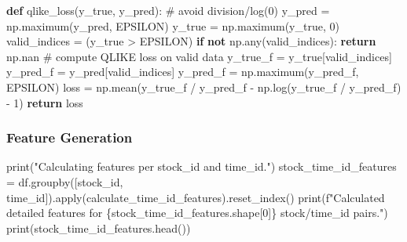 \documentclass[
  letterpaper,
  DIV=11,
  numbers=noendperiod]{scrartcl}
\newenvironment{Shaded}{\begin{snugshade}}{\end{snugshade}}
\newcommand{\BuiltInTok}[1]{\textcolor[rgb]{0.00,0.23,0.31}{#1}}
\newcommand{\CommentTok}[1]{\textcolor[rgb]{0.37,0.37,0.37}{#1}}
\newcommand{\ControlFlowTok}[1]{\textcolor[rgb]{0.00,0.23,0.31}{\textbf{#1}}}
\newcommand{\DecValTok}[1]{\textcolor[rgb]{0.68,0.00,0.00}{#1}}
\newcommand{\KeywordTok}[1]{\textcolor[rgb]{0.00,0.23,0.31}{\textbf{#1}}}
\newcommand{\NormalTok}[1]{\textcolor[rgb]{0.00,0.23,0.31}{#1}}
\newcommand{\OperatorTok}[1]{\textcolor[rgb]{0.37,0.37,0.37}{#1}}
\newcommand{\SpecialCharTok}[1]{\textcolor[rgb]{0.37,0.37,0.37}{#1}}
\newcommand{\SpecialStringTok}[1]{\textcolor[rgb]{0.13,0.47,0.30}{#1}}
\newcommand{\StringTok}[1]{\textcolor[rgb]{0.13,0.47,0.30}{#1}}
\begin{document}
\begin{Shaded}
\begin{Highlighting}[]
\KeywordTok{def}\NormalTok{ qlike\_loss(y\_true, y\_pred):}
    \CommentTok{\# avoid division/log(0)}
\NormalTok{    y\_pred }\OperatorTok{=}\NormalTok{ np.maximum(y\_pred, EPSILON)}
\NormalTok{    y\_true }\OperatorTok{=}\NormalTok{ np.maximum(y\_true, }\DecValTok{0}\NormalTok{)}
\NormalTok{    valid\_indices }\OperatorTok{=}\NormalTok{ (y\_true }\OperatorTok{\textgreater{}}\NormalTok{ EPSILON)}
    \ControlFlowTok{if} \KeywordTok{not}\NormalTok{ np.}\BuiltInTok{any}\NormalTok{(valid\_indices):}
        \ControlFlowTok{return}\NormalTok{ np.nan}
    \CommentTok{\# compute QLIKE loss on valid data}
\NormalTok{    y\_true\_f }\OperatorTok{=}\NormalTok{ y\_true[valid\_indices]}
\NormalTok{    y\_pred\_f }\OperatorTok{=}\NormalTok{ y\_pred[valid\_indices]}
\NormalTok{    y\_pred\_f }\OperatorTok{=}\NormalTok{ np.maximum(y\_pred\_f, EPSILON)}
\NormalTok{    loss }\OperatorTok{=}\NormalTok{ np.mean(y\_true\_f }\OperatorTok{/}\NormalTok{ y\_pred\_f }\OperatorTok{{-}}\NormalTok{ np.log(y\_true\_f }\OperatorTok{/}\NormalTok{ y\_pred\_f) }\OperatorTok{{-}} \DecValTok{1}\NormalTok{)}
    \ControlFlowTok{return}\NormalTok{ loss}
\end{Highlighting}
\end{Shaded}

\subsubsection{Feature Generation}\label{feature-generation}

\begin{Shaded}
\begin{Highlighting}[]
\BuiltInTok{print}\NormalTok{(}\StringTok{"Calculating features per stock\_id and time\_id."}\NormalTok{)}
\NormalTok{stock\_time\_id\_features }\OperatorTok{=}\NormalTok{ df.groupby([}\StringTok{\textquotesingle{}stock\_id\textquotesingle{}}\NormalTok{, }\StringTok{\textquotesingle{}time\_id\textquotesingle{}}\NormalTok{]).}\BuiltInTok{apply}\NormalTok{(calculate\_time\_id\_features).reset\_index()}
\BuiltInTok{print}\NormalTok{(}\SpecialStringTok{f"Calculated detailed features for }\SpecialCharTok{\{}\NormalTok{stock\_time\_id\_features}\SpecialCharTok{.}\NormalTok{shape[}\DecValTok{0}\NormalTok{]}\SpecialCharTok{\}}\SpecialStringTok{ stock/time\_id pairs."}\NormalTok{)}
\BuiltInTok{print}\NormalTok{(stock\_time\_id\_features.head())}
\end{Highlighting}
\end{Shaded}
\end{document}
